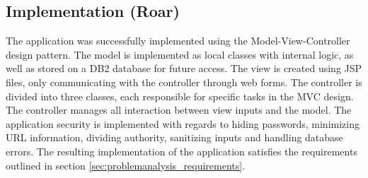 \subsection{Implementation (Roar)}


The application was successfully implemented using the Model-View-Controller design pattern. The model is implemented as local classes with internal logic, as well as stored on a DB2 database for future access. The view is created using JSP files, only communicating with the controller through web forms. The controller is divided into three classes, each responsible for specific tasks in the MVC design. The controller manages all interaction between view inputs and the model. The application security is implemented with regards to hiding passwords, minimizing URL information, dividing authority, sanitizing inputs and handling database errors. The resulting implementation of the application satisfies the requirements outlined in section \ref{sec:problemanalysis_requirements}.
